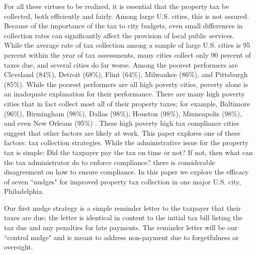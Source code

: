 \documentclass[12pt]{article}
\begin{document}
For all these virtues to be realized, it is essential that the
property tax be collected, both efficiently and fairly.  Among large
U.S. cities, this is not assured.  Because of the importance of the tax
to city budgets, even small differences in collection rates can
significantly affect the provision of local public services. While the
average rate of tax collection among a sample of large U.S. cities is
95 percent within the year of tax assessments, many cities collect
only 90 percent of taxes due, and several cities do far worse.  Among
the poorest performers are Cleveland (84\%), Detroit (68\%), Flint
(64\%), Milwaukee (86\%), and Pittsburgh (85\%). While the poorest
performers are all high poverty cities, poverty alone is an inadequate explanation 
for their performance. There are many high poverty
cities that in fact collect most all of their property taxes; for
example, Baltimore (96\%), Birmingham (98\%), Dallas (98\%), Houston
(98\%), Minneapolis (98\%), and even New Orleans (95\%)
\cite{CILMS-16}.  These high poverty high tax compliance cities suggest
that other factors are likely at work.  This paper explores one of these factors: 
tax collection strategies. While the administrative issue for the property tax is simple: Did the
taxpayer pay the tax on time or not?  If not, then what can the tax
administrator do to enforce compliance?  there is considerable disagreement on
how to ensure compliance. In this paper we explore the efficacy
of seven ``nudges" for improved property tax collection in one major
U.S. city, Philadelphia. 

Our first nudge strategy is a simple reminder letter to the taxpayer
that their taxes are due; the letter is identical in content to the
initial tax bill listing the tax due and  any penalties for late
payments.  The reminder letter will be our ``control nudge" and is
meant to address non-payment due to forgetfulness or oversight.
\end{document}
